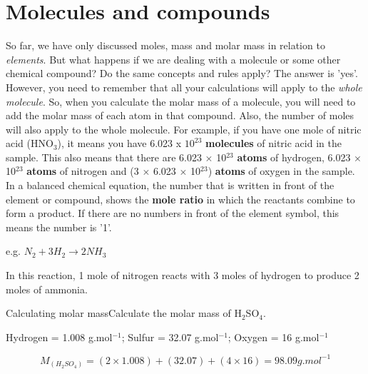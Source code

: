 



\section{Molecules and compounds}
\label{sec:quant:molecules}

So far, we have only discussed moles, mass and molar mass in relation to \textit{elements}. But what happens if we are dealing with a molecule or some other chemical compound? Do the same concepts and rules apply? The answer is 'yes'. However, you need to remember that all your calculations will apply to the \textit{whole molecule}. So, when you calculate the molar mass of a molecule, you will need to add the molar mass of each atom in that compound. Also, the number of moles will also apply to the whole molecule. For example, if you have one mole of nitric acid (HNO$_{3}$), it means you have 6.023 x $10^{23}$ \textbf{molecules} of nitric acid in the sample. This also means that there are 6.023 $\times$ 10$^{23}$ \textbf{atoms} of hydrogen, 6.023 $\times$ 10$^{23}$ \textbf{atoms} of nitrogen and (3 $\times$ 6.023 $\times$ 10$^{23}$) \textbf{atoms} of oxygen in the sample. \\

In a balanced chemical equation, the number that is written in front of the element or compound, shows the \textbf{mole ratio} in which the reactants combine to form a product. If there are no numbers in front of the element symbol, this means the number is '1'.

\begin{center}
e.g. \rm${N_{2} + 3H_{2} \rightarrow 2NH_{3}}$
\end{center}

In this reaction, 1 mole of nitrogen reacts with 3 moles of hydrogen to produce 2 moles of ammonia.
 
\begin{wex}{Calculating molar mass}{Calculate the molar mass of H$_{2}$SO$_{4}$.\\}

{

Hydrogen = 1.008 g.mol$^{-1}$; Sulfur = 32.07 g.mol$^{-1}$; Oxygen = 16 g.mol$^{-1}$\\}

{

\begin{equation*}
M_{(H_{2}SO_{4})} = (2 \times 1.008) + (32.07) + (4 \times 16) = 98.09 g.mol^{-1}
\end{equation*}
}

\end{wex} 

